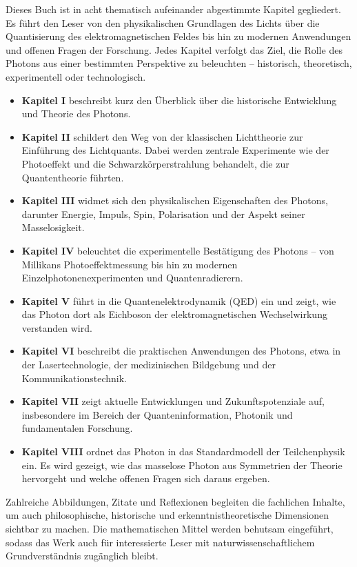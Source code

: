 Dieses Buch ist in acht thematisch aufeinander abgestimmte Kapitel gegliedert. Es führt den Leser von den physikalischen Grundlagen des Lichts über die Quantisierung des elektromagnetischen Feldes bis hin zu modernen Anwendungen und offenen Fragen der Forschung. Jedes Kapitel verfolgt das Ziel, die Rolle des Photons aus einer bestimmten Perspektive zu beleuchten – historisch, theoretisch, experimentell oder technologisch.

\begin{itemize}
	\item \textbf{Kapitel I} beschreibt kurz den Überblick über die historische Entwicklung  und Theorie des Photons.
	\item \textbf{Kapitel II} schildert den Weg von der klassischen Lichttheorie zur Einführung des Lichtquants. Dabei werden zentrale Experimente wie der Photoeffekt und die Schwarzkörperstrahlung behandelt, die zur Quantentheorie führten.
	
	\item \textbf{Kapitel III} widmet sich den physikalischen Eigenschaften des Photons, darunter Energie, Impuls, Spin, Polarisation und der Aspekt seiner Masselosigkeit.
	
	\item \textbf{Kapitel IV} beleuchtet die experimentelle Bestätigung des Photons – von Millikans Photoeffektmessung bis hin zu modernen Einzelphotonenexperimenten und Quantenradierern.
	
	\item \textbf{Kapitel V} führt in die Quantenelektrodynamik (QED) ein und zeigt, wie das Photon dort als Eichboson der elektromagnetischen Wechselwirkung verstanden wird.
	
	\item \textbf{Kapitel VI} beschreibt die praktischen Anwendungen des Photons, etwa in der Lasertechnologie, der medizinischen Bildgebung und der Kommunikationstechnik.
	
	\item \textbf{Kapitel VII} zeigt aktuelle Entwicklungen und Zukunftspotenziale auf, insbesondere im Bereich der Quanteninformation, Photonik und fundamentalen Forschung.
	
	\item \textbf{Kapitel VIII} ordnet das Photon in das Standardmodell der Teilchenphysik ein. Es wird gezeigt, wie das masselose Photon aus Symmetrien der Theorie hervorgeht und welche offenen Fragen sich daraus ergeben.
\end{itemize}
Zahlreiche Abbildungen, Zitate und Reflexionen begleiten die fachlichen Inhalte, um auch philosophische, historische und erkenntnistheoretische Dimensionen sichtbar zu machen. Die mathematischen Mittel werden behutsam eingeführt, sodass das Werk auch für interessierte Leser mit naturwissenschaftlichem Grundverständnis zugänglich bleibt.

